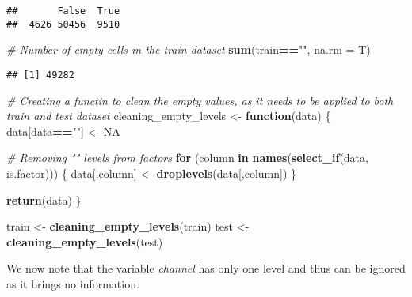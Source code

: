 \documentclass[]{article}
\newenvironment{Shaded}{\begin{snugshade}}{\end{snugshade}}
\newcommand{\KeywordTok}[1]{\textcolor[rgb]{0.13,0.29,0.53}{\textbf{#1}}}
\newcommand{\DataTypeTok}[1]{\textcolor[rgb]{0.13,0.29,0.53}{#1}}
\newcommand{\StringTok}[1]{\textcolor[rgb]{0.31,0.60,0.02}{#1}}
\newcommand{\CommentTok}[1]{\textcolor[rgb]{0.56,0.35,0.01}{\textit{#1}}}
\newcommand{\OtherTok}[1]{\textcolor[rgb]{0.56,0.35,0.01}{#1}}
\newcommand{\ControlFlowTok}[1]{\textcolor[rgb]{0.13,0.29,0.53}{\textbf{#1}}}
\newcommand{\OperatorTok}[1]{\textcolor[rgb]{0.81,0.36,0.00}{\textbf{#1}}}
\newcommand{\NormalTok}[1]{#1}
\begin{document}
\begin{Shaded}
\end{Shaded}

\begin{verbatim}
##       False  True 
##  4626 50456  9510
\end{verbatim}

\begin{Shaded}
\begin{Highlighting}[]
\CommentTok{# Number of empty cells in the train dataset}
\KeywordTok{sum}\NormalTok{(train}\OperatorTok{==}\StringTok{""}\NormalTok{, }\DataTypeTok{na.rm =}\NormalTok{ T)}
\end{Highlighting}
\end{Shaded}

\begin{verbatim}
## [1] 49282
\end{verbatim}

\begin{Shaded}
\begin{Highlighting}[]
\CommentTok{# Creating a functin to clean the empty values, as it needs to be applied to both train and test dataset }
\NormalTok{cleaning_empty_levels <-}\StringTok{ }\ControlFlowTok{function}\NormalTok{(data) \{}
\NormalTok{  data[data}\OperatorTok{==}\StringTok{""}\NormalTok{] <-}\StringTok{ }\OtherTok{NA}

  \CommentTok{# Removing "" levels from factors}
  \ControlFlowTok{for}\NormalTok{ (column }\ControlFlowTok{in} \KeywordTok{names}\NormalTok{(}\KeywordTok{select_if}\NormalTok{(data, is.factor))) \{}
\NormalTok{    data[,column] <-}\StringTok{ }\KeywordTok{droplevels}\NormalTok{(data[,column])}
\NormalTok{  \}}
  
  \KeywordTok{return}\NormalTok{(data)}
\NormalTok{\}}

\NormalTok{train <-}\StringTok{ }\KeywordTok{cleaning_empty_levels}\NormalTok{(train)}
\NormalTok{test <-}\StringTok{ }\KeywordTok{cleaning_empty_levels}\NormalTok{(test)}
\end{Highlighting}
\end{Shaded}

We now note that the variable \emph{channel} has only one level and thus
can be ignored as it brings no information.
\end{document}
